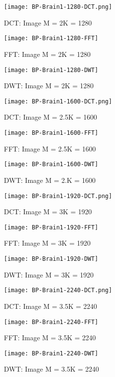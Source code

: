 \documentclass[titlepage,oneside, 12pt]{book}
\theoremstyle{break}
\begin{document}
\clearpage
\begin{figure}[!h]
\centering
{}
  \texttt{[image: BP-Brain1-1280-DCT.png]}
  \caption{DCT: Image M = 2K = 1280}\label{fig:BP-Brain1-1280-DCT}
\endminipage
\hspace*{2em}
  \texttt{[image: BP-Brain1-1280-FFT]}
  \caption{FFT: Image M = 2K = 1280}\label{fig:BP-Brain1-1280-FFT}
\endminipage
\hspace*{2em}
%
  \texttt{[image: BP-Brain1-1280-DWT]}
  \caption{DWT: Image M = 2K = 1280}\label{fig:BP-Brain1-1280-DWT}
\endminipage
\hspace*{2em}
\end{figure}

\begin{figure}[!h]
\centering
{}
  \texttt{[image: BP-Brain1-1600-DCT.png]}
  \caption{DCT: Image M = 2.5K = 1600}\label{fig:BP-Brain1-1600-DCT}
\endminipage
\hspace*{2em}
  \texttt{[image: BP-Brain1-1600-FFT]}
  \caption{FFT: Image M = 2.5K = 1600}\label{fig:BP-Brain1-1600-FFT}
\endminipage
\hspace*{2em}
%
  \texttt{[image: BP-Brain1-1600-DWT]}
  \caption{DWT: Image M = 2.K = 1600}\label{fig:BP-Brain1-1600-DWT}
\endminipage
\hspace*{2em}
\end{figure}

\begin{figure}[!h]
\centering
{}
  \texttt{[image: BP-Brain1-1920-DCT.png]}
  \caption{DCT: Image M = 3K = 1920}\label{fig:BP-Brain1-1920-DCT}
\endminipage
\hspace*{2em}
  \texttt{[image: BP-Brain1-1920-FFT]}
  \caption{FFT: Image M = 3K = 1920}\label{fig:BP-Brain1-1920-FFT}
\endminipage
\hspace*{2em}
%
  \texttt{[image: BP-Brain1-1920-DWT]}
  \caption{DWT: Image M = 3K = 1920}\label{fig:BP-Brain1-1920-DWT}
\endminipage
\hspace*{2em}
\end{figure}

\clearpage

\begin{figure}[!h]
\centering
{}
  \texttt{[image: BP-Brain1-2240-DCT.png]}
  \caption{DCT: Image M = 3.5K = 2240}\label{fig:BP-Brain1-2240-DCT}
\endminipage
\hspace*{2em}
  \texttt{[image: BP-Brain1-2240-FFT]}
  \caption{FFT: Image M = 3.5K = 2240}\label{fig:BP-Brain1-2240-FFT}
\endminipage
\hspace*{2em}
%
  \texttt{[image: BP-Brain1-2240-DWT]}
  \caption{DWT: Image M = 3.5K = 2240}\label{fig:BP-Brain1-2240-DWT}
\endminipage
\hspace*{2em}
\end{figure}
\end{document}

